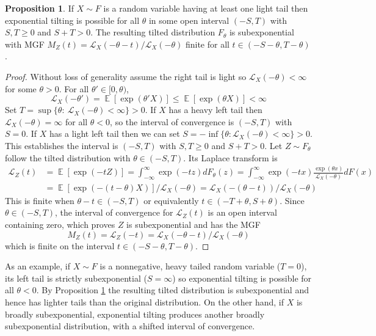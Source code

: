 \documentclass{article}
\theoremstyle{definition}
\newtheorem{proposition}{Proposition}[section]
\DeclareMathOperator{\E}{\mathbb{E}}
\begin{document}
\begin{proposition}
\label{prop:exp-tilt-general-exp}
If $X\sim F$ is a random variable having at least one light tail then exponential tilting is possible for all $\theta$ in some open interval $(-S,T)$ with $S,T\geq 0$ and $S+T>0$. The resulting tilted distribution $F_\theta$ is subexponential with MGF $M_Z(t)=\mathcal{L}_X(-\theta-t)/\mathcal{L}_X(-\theta)$ finite for all $t\in (-S-\theta,T-\theta)$.
\end{proposition}
\begin{proof}
Without loss of generality assume the right tail is light so $\mathcal{L}_X(-\theta)<\infty$ for some $\theta>0$. For all $\theta'\in [0,\theta)$, 
\[\mathcal{L}_X(-\theta')=\E[\exp(\theta'X)] \leq \E[\exp(\theta X)]<\infty\]
Set $T=\sup\{\theta:~\mathcal{L}_X(-\theta)<\infty\}>0$. If $X$ has a heavy left tail then $\mathcal{L}_X(-\theta)=\infty$ for all $\theta<0$, so the interval of convergence is $(-S,T)$ with $S=0$. If $X$ has a light left tail then we can set $S=-\inf\{\theta:\mathcal{L}_X(-\theta)<\infty\}>0$. This establishes the interval is $(-S,T)$ with $S,T\geq 0$ and $S+T>0$. Let $Z\sim F_\theta$ follow the tilted distribution with $\theta\in (-S,T)$. Its Laplace transform is
\begin{align*}
\mathcal{L}_Z(t)&=\E[\exp(-tZ)] = \int_{-\infty}^\infty \exp(-tz)dF_\theta(z) = \int_{-\infty}^\infty \exp(-tx)\frac{\exp(\theta x)}{\mathcal{L}_X(-\theta)}dF(x) \\
&= \E[\exp(-(t-\theta)X)]/\mathcal{L}_X(-\theta) = \mathcal{L}_X(-(\theta-t))/\mathcal{L}_X(-\theta)
\end{align*}
This is finite when $\theta-t \in (-S,T)$ or equivalently $t \in (-T+\theta, S+\theta)$. Since $\theta\in (-S,T)$, the interval of convergence for $\mathcal{L}_Z(t)$ is an open interval containing zero, which proves $Z$ is subexponential and has the MGF
\[M_Z(t)=\mathcal{L}_Z(-t)=\mathcal{L}_X(-\theta-t)/\mathcal{L}_X(-\theta)\]
which is finite on the interval $t\in (-S-\theta, T-\theta)$. 
\end{proof}

As an example, if $X\sim F$ is a nonnegative, heavy tailed random variable ($T=0$), its left tail is strictly subexponential ($S=\infty$) so exponential tilting is possible for all $\theta<0$. By Proposition \ref{prop:exp-tilt-general-exp} the resulting tilted distribution is subexponential and hence has lighter tails than the original distribution. On the other hand, if $X$ is broadly subexponential, exponential tilting produces another broadly subexponential distribution, with a shifted interval of convergence.
\end{document}
